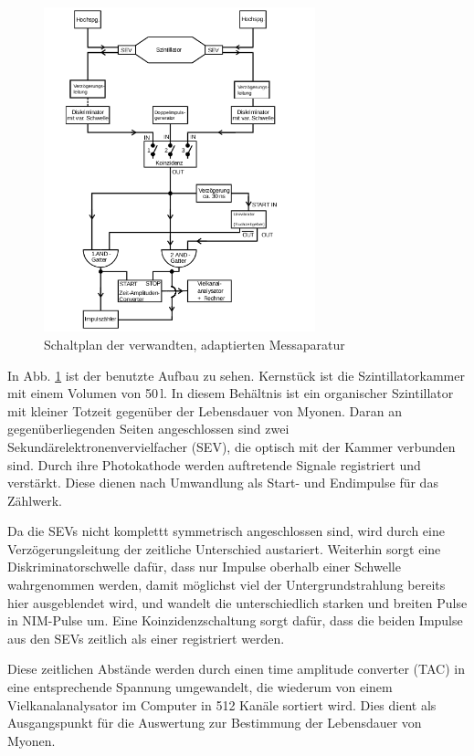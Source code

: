 \begin{figure}[t]
	\includegraphics[width=0.7\textwidth]{../pics/blockAdaptiert.png}
	\caption{Schaltplan der verwandten, adaptierten Messaparatur \cite{Anl}}
	\label{pic:setup}
\end{figure}

In Abb. \ref{pic:setup} ist der benutzte Aufbau zu sehen. Kernst\"uck ist die Szintillatorkammer mit einem Volumen von 50\,l. In diesem Beh\"altnis ist ein organischer Szintillator mit kleiner Totzeit gegen\"uber der Lebensdauer von Myonen. Daran an gegen\"uberliegenden Seiten angeschlossen sind zwei Sekund\"arelektronenvervielfacher (SEV), die optisch mit der Kammer verbunden sind. Durch ihre Photokathode werden auftretende Signale registriert und verst\"arkt. Diese dienen nach Umwandlung als Start- und Endimpulse f\"ur das Z\"ahlwerk.

Da die SEVs nicht komplettt symmetrisch angeschlossen sind, wird durch eine Verz\"ogerungsleitung der zeitliche Unterschied austariert. Weiterhin sorgt eine Diskriminatorschwelle daf\"ur, dass nur Impulse oberhalb einer Schwelle wahrgenommen werden, damit m\"oglichst viel der Untergrundstrahlung bereits hier ausgeblendet wird, und wandelt die unterschiedlich starken und breiten Pulse in NIM-Pulse um. Eine Koinzidenzschaltung sorgt daf\"ur, dass die beiden Impulse aus den SEVs zeitlich als einer registriert werden. 

Diese zeitlichen Abst\"ande werden durch einen time amplitude converter (TAC) in eine entsprechende Spannung umgewandelt, die wiederum von einem Vielkanalanalysator im Computer in 512 Kan\"ale sortiert wird. Dies dient als Ausgangspunkt f\"ur die Auswertung zur Bestimmung der Lebensdauer von Myonen.

